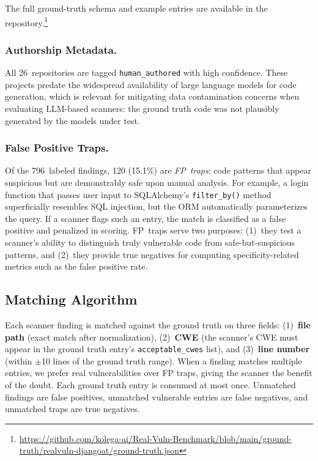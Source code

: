 \noindent
The full ground-truth schema and example entries are available in the repository.\footnote{\url{https://github.com/kolega-ai/Real-Vuln-Benchmark/blob/main/ground-truth/realvuln-djangoat/ground-truth.json}}

\subsubsection{Authorship Metadata.}
All 26~repositories are tagged \texttt{human\_authored} with high confidence.
These projects predate the widespread availability of large language models for code generation, which is relevant for mitigating data contamination concerns when evaluating LLM-based scanners: the ground truth code was not plausibly generated by the models under test.

\subsubsection{False Positive Traps.}
Of the 796~labeled findings, 120 (15.1\%) are \emph{FP~traps}: code patterns that appear suspicious but are demonstrably safe upon manual analysis.
For example, a login function that passes user input to SQLAlchemy's \texttt{filter\_by()} method superficially resembles SQL injection, but the ORM automatically parameterizes the query.
If a scanner flags such an entry, the match is classified as a false positive and penalized in scoring.
FP~traps serve two purposes: (1)~they test a scanner's ability to distinguish truly vulnerable code from safe-but-suspicious patterns, and (2)~they provide true negatives for computing specificity-related metrics such as the false positive rate.

\subsection{Matching Algorithm}
\label{sec:matching}

Each scanner finding is matched against the ground truth on three fields: (1)~\textbf{file path} (exact match after normalization), (2)~\textbf{CWE} (the scanner's CWE must appear in the ground truth entry's \texttt{acceptable\_cwes} list), and (3)~\textbf{line number} (within $\pm$10 lines of the ground truth range). When a finding matches multiple entries, we prefer real vulnerabilities over FP traps, giving the scanner the benefit of the doubt. Each ground truth entry is consumed at most once. Unmatched findings are false positives, unmatched vulnerable entries are false negatives, and unmatched traps are true negatives.

